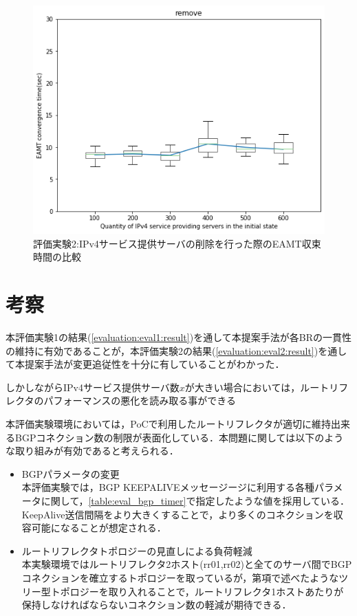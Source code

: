 \begin{figure}[]
    \begin{center}
    \includegraphics[width=12cm,pagebox=cropbox,clip]{img/eval2_result_remove.png}
    \end{center}
    \caption{評価実験2:IPv4サービス提供サーバの削除を行った際のEAMT収束時間の比較}
    \label{fig:eval2_result_remove}
\end{figure}



\newpage
\section{考察}
\label{evaluation:consideration}
本評価実験1の結果(\ref{evaluation:eval1:result})を通して本提案手法が各BRの一貫性の維持に有効であることが，本評価実験2の結果(\ref{evaluation:eval2:result})を通して本提案手法が変更追従性を十分に有していることがわかった．

しかしながらIPv4サービス提供サーバ数$x$が大きい場合においては，ルートリフレクタのパフォーマンスの悪化を読み取る事ができる

本評価実験環境においては，PoCで利用したルートリフレクタが適切に維持出来るBGPコネクション数の制限が表面化している．本問題に関しては以下のような取り組みが有効であると考えられる．
\begin{itemize}
    \item BGPパラメータの変更 \\
    本評価実験では，BGP KEEPALIVEメッセージージに利用する各種パラメータに関して，\ref{table:eval_bgp_timer}で指定したような値を採用している．KeepAlive送信間隔をより大きくすることで，より多くのコネクションを収容可能になることが想定される．
    \item ルートリフレクタトポロジーの見直しによる負荷軽減 \\
    本実験環境ではルートリフレクタ2ホスト(rr01,rr02)と全てのサーバ間でBGPコネクションを確立するトポロジーを取っているが，第\label{proposal:network_rr}項で述べたようなツリー型トポロジーを取り入れることで，ルートリフレクタ1ホストあたりが保持しなければならないコネクション数の軽減が期待できる．
\end{itemize}



